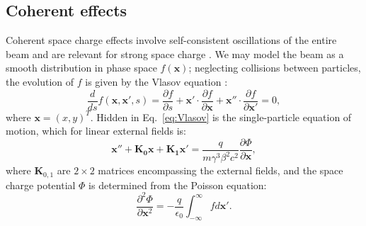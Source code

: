 \subsection{Coherent effects}

Coherent space charge effects involve self-consistent oscillations of the entire beam and are relevant for strong space charge \cite{book:Reiser, Wangler2008, Cousineau2003}. We may model the beam as a smooth distribution in phase space $f(\mathbf{x})$; neglecting collisions between particles, the evolution of $f$ is given by the Vlasov equation \cite{Vlasov1961}:
%
\begin{equation} \label{eq:Vlasov}
    \frac{d}{ds}{f(\mathbf{x}, \mathbf{x}', s)} = 
    \frac{\partial{f}}{\partial{s}} +
    \mathbf{x}' \cdot \frac{\partial{f}}{\partial{\mathbf{x}}} +
    \mathbf{x}'' \cdot \frac{\partial{f}}{\partial{\mathbf{x'}}}
    = 0,
\end{equation}
%
where $\mathbf{x} = (x, y)^T$. Hidden in Eq.~\eqref{eq:Vlasov} is the single-particle equation of motion, which for linear external fields is:
%
\begin{equation}
    \mathbf{x}'' + \mathbf{K_0} \mathbf{x} + \mathbf{K_1} \mathbf{x}'
    =
    \frac{q}{m\gamma^3\beta^2c^2} \frac{\partial{\Phi}}{\partial\mathbf{x}},
\end{equation}
%
where $\mathbf{K}_{0, 1}$ are $2 \times 2$ matrices encompassing the external fields, and the space charge potential $\Phi$ is determined from the Poisson equation:
%
\begin{equation} \label{eq:Poisson}
    \frac{\partial^2{\Phi}}{\partial{\mathbf{x}^2}} = -\frac{q}{\epsilon_0}\int_{-\infty}^{\infty}{f}d\mathbf{x}'.
\end{equation}
%


